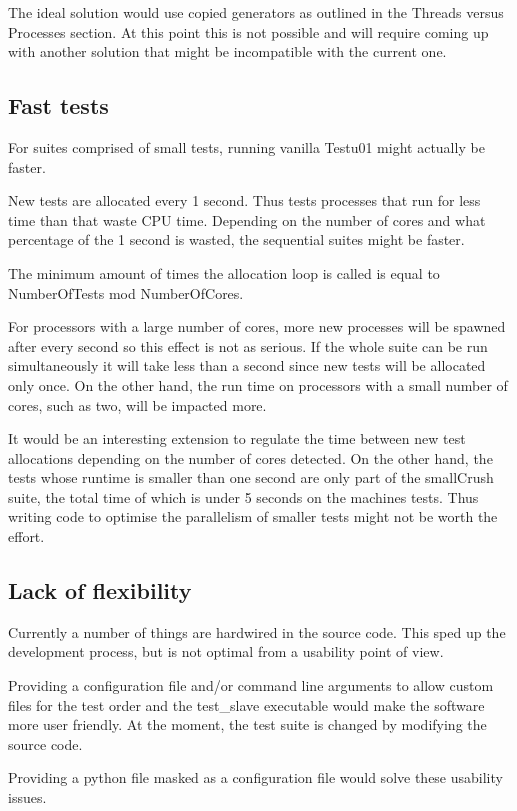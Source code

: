 The ideal solution would use copied generators as outlined in the Threads versus Processes section. At this point this is not possible and will require coming up with another solution that might be incompatible with the current one.

\subsection{Fast tests}
For suites comprised of small tests, running vanilla Testu01 might actually be faster.

New tests are allocated every 1 second. Thus tests processes that run for less time than that waste CPU time. Depending on the number of cores and what percentage of the 1 second is wasted, the sequential suites might be faster.

The minimum amount of times the allocation loop is called is equal to NumberOfTests mod NumberOfCores.

For processors with a large number of cores, more new processes will be spawned after every second so this effect is not as serious. If the whole suite can be run simultaneously it will take less than a second since new tests will be allocated only once. On the other hand, the run time on processors with a small number of cores, such as two, will be impacted more.

It would be an interesting extension to regulate the time between new test allocations depending on the number of cores detected. On the other hand, the tests whose runtime is smaller than one second are only part of the smallCrush suite, the total time of which is under 5 seconds on the machines tests. Thus writing code to optimise the parallelism of smaller tests might not be worth the effort.

\subsection{Lack of flexibility}
Currently a number of things are hardwired in the source code. This sped up the development process, but is not optimal from a usability point of view.

Providing a configuration file and/or command line arguments to allow custom files for the test order and the test\_slave executable would make the software more user friendly. At the moment, the test suite is changed by modifying the source code.

Providing a python file masked as a configuration file would solve these usability issues.



